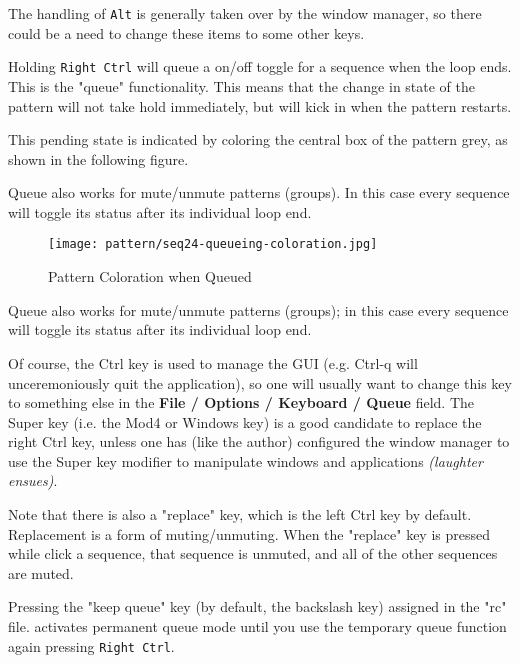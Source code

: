    The handling of \texttt{Alt} is generally taken over by the window
   manager, so there could be a need to change these items to some other
   keys.


	Holding \texttt{Right Ctrl} will queue a on/off toggle for a 
	sequence when the loop ends. This is the "queue" functionality.
   This means that the change in state of the pattern will not take hold
   immediately, but will kick in when the pattern restarts.

   This pending state is indicated by coloring the central box of the
   pattern grey, as shown in the following figure.

   Queue also works for mute/unmute patterns (groups). In this case every
   sequence will toggle its status after its individual loop end.

\begin{figure}[H]
   \centering 
   \texttt{[image: pattern/seq24-queueing-coloration.jpg]}
   \caption{Pattern Coloration when Queued}
   \label{fig:seq64_queueing_coloration}
\end{figure}

   Queue also works for mute/unmute 
	patterns (groups); in this case every sequence will toggle 
	its status after its individual loop end. 

   Of course, the Ctrl key is used to manage the GUI (e.g. Ctrl-q will
   unceremoniously quit the application), so one will usually want to change
   this key to something else in the
   \textbf{File / Options / Keyboard / Queue} field.
   The Super key (i.e. the Mod4 or Windows key) is a good candidate to
   replace the right Ctrl key, unless one has (like the author) configured
   the window manager to use the Super key modifier to manipulate windows
   and applications \textsl{(laughter ensues)}.

   Note that there is also a "replace" key, which is the left Ctrl key by
   default.  Replacement is a form of muting/unmuting.  When the "replace"
   key is pressed while click a sequence, that sequence is unmuted, and all
   of the other sequences are muted.

	Pressing the "keep queue" key (by default, the backslash key)
   assigned in the "rc" file.
	activates permanent queue mode until you use the temporary 
	queue function again pressing \texttt{Right Ctrl}. 

